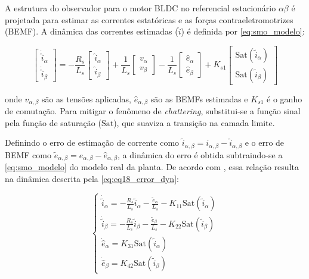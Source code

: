 A estrutura do observador para o motor BLDC no referencial estacionário $\alpha\beta$ é projetada para estimar as correntes estatóricas e as forças contraeletromotrizes (BEMF). A dinâmica das correntes estimadas ($\hat{i}$) é definida por \eqref{eq:smo_modelo}:

\begin{equation}
    \begin{bmatrix}
        \dot{\hat{i}}_{\alpha} \\ \dot{\hat{i}}_{\beta}
    \end{bmatrix} =
    -\frac{R_s}{L_s} \begin{bmatrix} \hat{i}_{\alpha} \\ \hat{i}_{\beta} \end{bmatrix}
    + \frac{1}{L_s} \begin{bmatrix} v_{\alpha} \\ v_{\beta} \end{bmatrix}
    - \frac{1}{L_s} \begin{bmatrix} \hat{e}_{\alpha} \\ \hat{e}_{\beta} \end{bmatrix}
    + K_{s1} \begin{bmatrix} \text{Sat}(\tilde{i}_{\alpha}) \\ \text{Sat}(\tilde{i}_{\beta}) \end{bmatrix}
    \label{eq:smo_modelo}
\end{equation}

onde $v_{\alpha,\beta}$ são as tensões aplicadas, $\hat{e}_{\alpha,\beta}$ são as BEMFs estimadas e $K_{s1}$ é o ganho de comutação. Para mitigar o fenômeno de \textit{chattering}, substitui-se a função sinal pela função de saturação ($\text{Sat}$), que suaviza a transição na camada limite.

Definindo o erro de estimação de corrente como $\tilde{i}_{\alpha,\beta} = i_{\alpha,\beta} - \hat{i}_{\alpha,\beta}$ e o erro de BEMF como $\tilde{e}_{\alpha,\beta} = e_{\alpha,\beta} - \hat{e}_{\alpha,\beta}$, a dinâmica do erro é obtida subtraindo-se a \eqref{eq:smo_modelo} do modelo real da planta. De acordo com \cite{AbKaf2024}, essa relação resulta na dinâmica descrita pela \autoref{eq:eq18_error_dyn}:

\begin{equation}
    \begin{cases}
        \dot{\tilde{i}}_{\alpha} = -\frac{R_s}{L_s}\tilde{i}_{\alpha} - \frac{\tilde{e}_{\alpha}}{L_s} - K_{11} \text{Sat}(\tilde{i}_{\alpha}) \\
        \dot{\tilde{i}}_{\beta} = -\frac{R_s}{L_s}\tilde{i}_{\beta} - \frac{\tilde{e}_{\beta}}{L_s} - K_{22} \text{Sat}(\tilde{i}_{\beta}) \\
        \dot{\hat{e}}_{\alpha} = K_{31} \text{Sat}(\tilde{i}_{\alpha}) \\
        \dot{\hat{e}}_{\beta} = K_{42} \text{Sat}(\tilde{i}_{\beta})
    \end{cases}
    \label{eq:eq18_error_dyn}
\end{equation}

